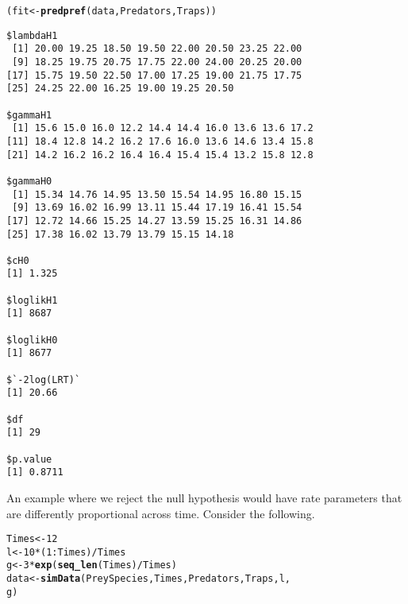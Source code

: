 \documentclass[12pt]{article}\usepackage[]{graphicx}\usepackage[]{color}
\makeatletter
\newcommand{\hlnum}[1]{\textcolor[rgb]{0.686,0.059,0.569}{#1}}%
\newcommand{\hlopt}[1]{\textcolor[rgb]{0,0,0}{#1}}%
\newcommand{\hlstd}[1]{\textcolor[rgb]{0.345,0.345,0.345}{#1}}%
\newcommand{\hlkwb}[1]{\textcolor[rgb]{0.69,0.353,0.396}{#1}}%
\newcommand{\hlkwd}[1]{\textcolor[rgb]{0.737,0.353,0.396}{\textbf{#1}}}%
\newenvironment{kframe}{%
 \def\at@end@of@kframe{}%
 \ifinner\ifhmode%
  \def\at@end@of@kframe{\end{minipage}}%
  \begin{minipage}{\columnwidth}%
 \fi\fi%
 \def\FrameCommand##1{\hskip\@totalleftmargin \hskip-\fboxsep
 \colorbox{shadecolor}{##1}\hskip-\fboxsep
     \hskip-\linewidth \hskip-\@totalleftmargin \hskip\columnwidth}%
 \MakeFramed {\advance\hsize-\width
   \@totalleftmargin\z@ \linewidth\hsize
   \@setminipage}}%
 {\par\unskip\endMakeFramed%
 \at@end@of@kframe}
\newenvironment{knitrout}{}{} %
\makeatother
\begin{document}
\begin{knitrout}
\color{fgcolor}\begin{kframe}
\begin{alltt}
\hlstd{(fit} \hlkwb{<-} \hlkwd{predpref}\hlstd{(data, Predators, Traps))}
\end{alltt}
\begin{verbatim}
$lambdaH1
 [1] 20.00 19.25 18.50 19.50 22.00 20.50 23.25 22.00
 [9] 18.25 19.75 20.75 17.75 22.00 24.00 20.25 20.00
[17] 15.75 19.50 22.50 17.00 17.25 19.00 21.75 17.75
[25] 24.25 22.00 16.25 19.00 19.25 20.50

$gammaH1
 [1] 15.6 15.0 16.0 12.2 14.4 14.4 16.0 13.6 13.6 17.2
[11] 18.4 12.8 14.2 16.2 17.6 16.0 13.6 14.6 13.4 15.8
[21] 14.2 16.2 16.2 16.4 16.4 15.4 15.4 13.2 15.8 12.8

$gammaH0
 [1] 15.34 14.76 14.95 13.50 15.54 14.95 16.80 15.15
 [9] 13.69 16.02 16.99 13.11 15.44 17.19 16.41 15.54
[17] 12.72 14.66 15.25 14.27 13.59 15.25 16.31 14.86
[25] 17.38 16.02 13.79 13.79 15.15 14.18

$cH0
[1] 1.325

$loglikH1
[1] 8687

$loglikH0
[1] 8677

$`-2log(LRT)`
[1] 20.66

$df
[1] 29

$p.value
[1] 0.8711
\end{verbatim}
\end{kframe}
\end{knitrout}


An example where we reject the null hypothesis would have rate parameters that are differently proportional across time.  Consider the following.

\begin{knitrout}
\color{fgcolor}\begin{kframe}
\begin{alltt}
\hlstd{Times} \hlkwb{<-} \hlnum{12}
\hlstd{l} \hlkwb{<-} \hlnum{10} \hlopt{*} \hlstd{(}\hlnum{1}\hlopt{:}\hlstd{Times)}\hlopt{/}\hlstd{Times}
\hlstd{g} \hlkwb{<-} \hlnum{3} \hlopt{*} \hlkwd{exp}\hlstd{(}\hlkwd{seq_len}\hlstd{(Times)}\hlopt{/}\hlstd{Times)}
\hlstd{data} \hlkwb{<-} \hlkwd{simData}\hlstd{(PreySpecies, Times, Predators, Traps, l,}
    \hlstd{g)}
\end{alltt}
\end{kframe}
\end{knitrout}
\end{document}
